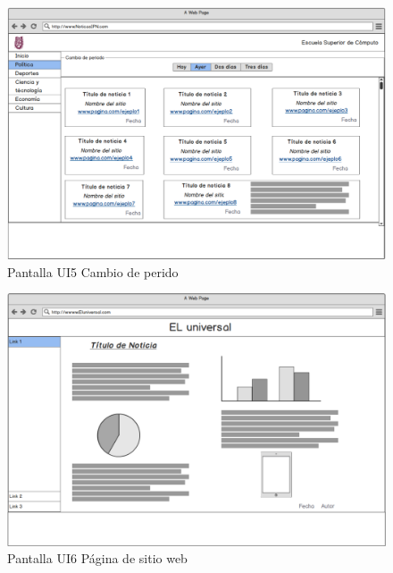 \begin{figure}[H]
  \centering
  \includegraphics[scale=.35]{imagenes/Pantallas/UI5}
  \caption{Pantalla UI5 Cambio de perido}
  \label{fig:UI5}
\end{figure}

\begin{figure}[H]
  \centering
	\includegraphics[scale=.35]{imagenes/Pantallas/UI6}
  \caption{Pantalla UI6 Página de sitio web}
  \label{fig:UI6}
\end{figure}